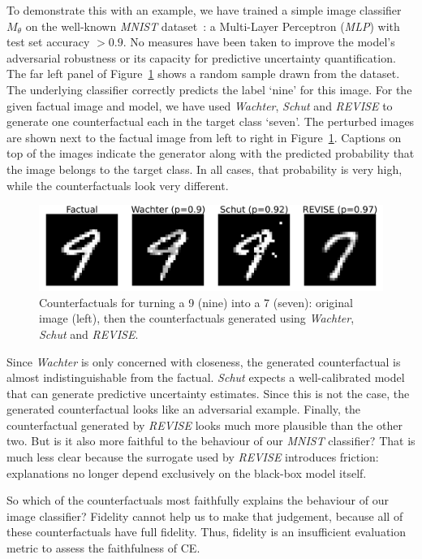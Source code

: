\documentclass[letterpaper]{article} %
\begin{document}
To demonstrate this with an example, we have trained a simple image classifier $M_{\theta}$ on the well-known \textit{MNIST} dataset~\citep{lecun1998mnist}: a Multi-Layer Perceptron (\textit{MLP}) with test set accuracy $> 0.9$. No measures have been taken to improve the model's adversarial robustness or its capacity for predictive uncertainty quantification. The far left panel of Figure~\ref{fig:motiv} shows a random sample drawn from the dataset. The underlying classifier correctly predicts the label `nine' for this image. For the given factual image and model, we have used \textit{Wachter}, \textit{Schut} and \textit{REVISE} to generate one counterfactual each in the target class `seven'. The perturbed images are shown next to the factual image from left to right in Figure~\ref{fig:motiv}. Captions on top of the images indicate the generator along with the predicted probability that the image belongs to the target class. In all cases, that probability is very high, while the counterfactuals look very different.

\begin{figure}
  \centering
  \includegraphics[width=0.8\linewidth]{figures/mnist_motivation.png}
  \caption{Counterfactuals for turning a 9 (nine) into a 7 (seven): original image (left), then the counterfactuals generated using \textit{Wachter}, \textit{Schut} and \textit{REVISE}.}\label{fig:motiv}
\end{figure}

Since \textit{Wachter} is only concerned with closeness, the generated counterfactual is almost indistinguishable from the factual. \textit{Schut} expects a well-calibrated model that can generate predictive uncertainty estimates. Since this is not the case, the generated counterfactual looks like an adversarial example. Finally, the counterfactual generated by \textit{REVISE} looks much more plausible than the other two. But is it also more faithful to the behaviour of our \textit{MNIST} classifier? That is much less clear because the surrogate used by \textit{REVISE} introduces friction: explanations no longer depend exclusively on the black-box model itself. 

So which of the counterfactuals most faithfully explains the behaviour of our image classifier? Fidelity cannot help us to make that judgement, because all of these counterfactuals have full fidelity. Thus, fidelity is an insufficient evaluation metric to assess the faithfulness of CE. 
\end{document}

